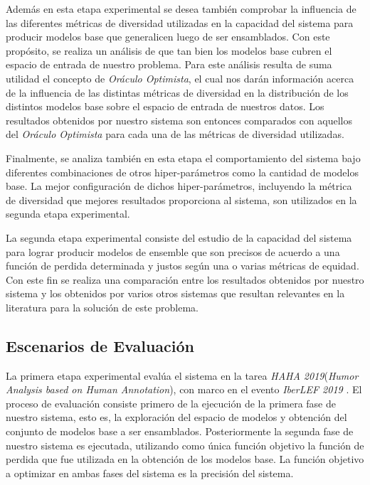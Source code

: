 Además en esta etapa experimental se desea también comprobar la influencia de las diferentes métricas de diversidad utilizadas en la capacidad del sistema para producir modelos base que generalicen luego de ser ensamblados.
Con este propósito, se realiza un análisis de que tan bien los modelos base cubren el espacio de entrada de nuestro problema.
Para este análisis resulta de suma utilidad el concepto de \emph{Oráculo Optimista}, el cual nos darán información acerca de la influencia de las distintas métricas de diversidad en la distribución de los distintos modelos base sobre el espacio de entrada de nuestros datos.
Los resultados obtenidos por nuestro sistema son entonces comparados con aquellos del \emph{Oráculo Optimista} para cada una de las métricas de diversidad utilizadas.

Finalmente, se analiza también en esta etapa el comportamiento del sistema bajo diferentes combinaciones de otros hiper-parámetros como la cantidad de modelos base.
La mejor configuración de dichos hiper-parámetros, incluyendo la métrica de diversidad que mejores resultados proporciona al sistema, son utilizados en la segunda etapa experimental.

La segunda etapa experimental consiste del estudio de la capacidad del sistema para lograr producir modelos de ensemble que son precisos de acuerdo a una función de perdida determinada y justos según una o varias métricas de equidad. 
Con este fin se realiza una comparación entre los resultados obtenidos por nuestro sistema y los obtenidos por varios otros sistemas que resultan relevantes en la literatura para la solución de este problema.

\subsection{Escenarios de Evaluación}

La primera etapa experimental evalúa el sistema en la tarea \emph{HAHA 2019}(\textit{Humor Analysis based on Human Annotation}), con marco en el evento \textit{IberLEF 2019} \parencite{chiruzzo2019overview}.
El proceso de evaluación consiste primero de la ejecución de la primera fase de nuestro sistema, esto es, la exploración del espacio de modelos y obtención del conjunto de modelos base a ser ensamblados.
Posteriormente la segunda fase de nuestro sistema es ejecutada, utilizando como única función objetivo la función de perdida que fue utilizada en la obtención de los modelos base.
La función objetivo a optimizar en ambas fases del sistema es la precisión del sistema.

